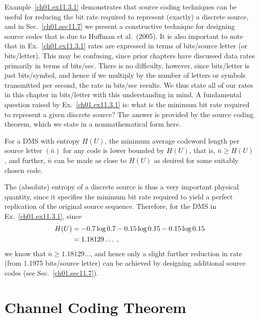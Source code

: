 Example~\ref{ch01.ex11.3.1} demonstrates that source coding techniques
can be useful
for reducing the bit rate required to represent (exactly) a discrete source,
and in
Sec.~\ref{ch01.sec11.7} we present a constructive technique for designing
source codes that
is due to Huffman et al.~(2005). It is also important to note that in
Ex.~\ref{ch01.ex11.3.1}
rates are expressed in terms of bits/source letter (or bits/letter).
This may be confusing, since prior chapters have discussed data rates
primarily in terms of
bits/sec. There is no difficulty, however, since bits/letter is just
bits/symbol, and
hence if we multiply by the number of letters or symbols transmitted
per second,
the rate in bits/sec results. We thus state all of our rates  in this
chapter in
bits/letter with this understanding in mind. A fundamental question raised by
Ex.~\ref{ch01.ex11.3.1} is: what is the minimum bit rate required to
represent a given
discrete source? The answer is provided by the source coding theorem, which
we state in a nonmathematical form here.

\begin{theorem}
\label{ch01.th11.3.1}
For a DMS with entropy $H(U)$,
the minimum average codeword length per source letter $(\bar{n})$ for any
code is lower
bounded by $H(U)$, that is, $\bar{n} \geq H(U)$, and further, $\bar{n}$
can be made as close to $H(U)$
as desired for some suitably chosen code.
\end{theorem}

The (absolute) entropy of a discrete source is thus a very important physical
quantity, since it specifies the minimum bit rate required to yield a perfect
replication of the original source sequence. Therefore, for the DMS in
Ex.~\ref{ch01.ex11.3.1}, since
\begin{align}
  H(U) & = -0.7 \log 0.7 -0.15 \log 0.15 - 0.15 \log 0.15
\notag\\
 & = 1.18129 \dots~,
\label{ch01.eq11.3.3}
\end{align}
we know that $\bar{n} \geq 1.18129 \dots $, and hence only a slight further
reduction in rate
(from 1.1975 bits/source letter) can be achieved by designing additional source
codes (see Sec.~\ref{ch01.sec11.7}).

\section{Channel Coding Theorem}
\label{ch01.sec11.4}

